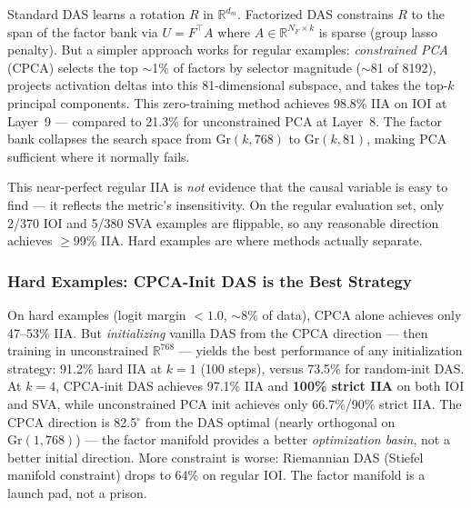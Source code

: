\documentclass[11pt]{article}
\begin{document}
Standard DAS learns a rotation $R$ in $\mathbb{R}^{d_m}$.
Factorized DAS constrains $R$ to the span of the factor bank via
$U = F^\top A$ where $A \in \mathbb{R}^{N_F \times k}$ is sparse
(group lasso penalty). But a simpler approach works for regular examples:
\emph{constrained PCA} (CPCA) selects the top $\sim$1\% of factors by selector
magnitude ($\sim$81 of 8192), projects activation deltas into this
81-dimensional subspace, and takes the top-$k$ principal components.
This zero-training method achieves 98.8\% IIA on IOI at Layer~9 ---
compared to 21.3\% for unconstrained PCA at Layer~8. The factor bank
collapses the search space from $\mathrm{Gr}(k, 768)$ to
$\mathrm{Gr}(k, 81)$, making PCA sufficient where it normally fails.

This near-perfect regular IIA is \emph{not} evidence that the causal
variable is easy to find --- it reflects the metric's insensitivity.
On the regular evaluation set, only 2/370 IOI and 5/380 SVA examples
are flippable, so any reasonable direction achieves $\geq$99\% IIA.
Hard examples are where methods actually separate.

\subsubsection{Hard Examples: CPCA-Init DAS is the Best Strategy}

On hard examples (logit margin $< 1.0$, $\sim$8\% of data),
CPCA alone achieves only 47--53\% IIA. But
\emph{initializing} vanilla DAS from the CPCA direction ---
then training in unconstrained $\mathbb{R}^{768}$ --- yields the best
performance of any initialization strategy:
91.2\% hard IIA at $k=1$ (100 steps), versus 73.5\% for random-init DAS.
At $k=4$, CPCA-init DAS achieves 97.1\% IIA and \textbf{100\% strict IIA}
on both IOI and SVA, while unconstrained PCA init achieves only
66.7\%/90\% strict IIA.
The CPCA direction is 82.5$^\circ$ from the DAS
optimal (nearly orthogonal on $\mathrm{Gr}(1, 768)$) --- the factor
manifold provides a better \emph{optimization basin}, not a better
initial direction.
More constraint is worse: Riemannian DAS (Stiefel manifold constraint)
drops to 64\% on regular IOI. The factor manifold is a launch pad, not
a prison.
\end{document}
